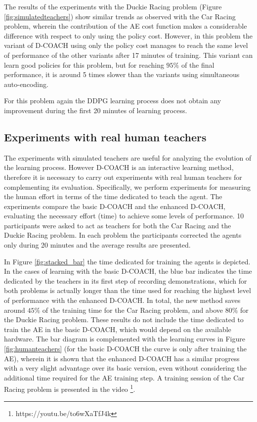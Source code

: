 The results of the experiments with the Duckie Racing problem (Figure \ref{fig:simulatedteachers}) show similar trends as observed with the Car Racing problem, wherein the contribution of the AE cost function makes a considerable difference with respect to only using the policy cost. However, in this problem the variant of D-COACH using only the policy cost manages to reach the same level of performance of the other variants after 17 minutes of training. This variant can learn good policies for this problem, but for reaching $95\%$ of the final performance, it is around 5 times slower than the variants using simultaneous auto-encoding.

For this problem again the DDPG learning process does not obtain any improvement during the first 20 minutes of learning process.

\subsection{Experiments with real human teachers}

The experiments with simulated teachers are useful for analyzing the evolution of the learning process. However D-COACH is an interactive learning method, therefore it is necessary to carry out experiments with real human teachers for complementing its evaluation. Specifically, we perform experiments for measuring the human effort in terms of the time dedicated to teach the agent. The experiments compare the basic D-COACH and the enhanced D-COACH, evaluating the necessary effort (time) to achieve some levels of performance. 10 participants were asked to act as teachers for both the Car Racing and the Duckie Racing problem. In each problem the participants corrected the agents only during 20 minutes and the average results are presented.

In Figure \ref{fig:stacked_bar} the time dedicated for training the agents is depicted. In the cases of learning with the basic D-COACH, the blue bar indicates the time dedicated by the teachers in its first step of recording demonstrations, which for both problems is actually longer than the time used for reaching the highest level of performance with the enhanced D-COACH. In total, the new method saves around $45\%$ of the training time for the Car Racing problem, and above $80\%$ for the Duckie Racing problem. These results do not include the time dedicated to train the AE in the basic D-COACH, which would depend on the available hardware. The bar diagram is complemented with the learning curves in Figure \ref{fig:humanteachers} (for the basic D-COACH the curve is only after training the AE), wherein it is shown that the enhanced D-COACH has a similar progress with a very slight advantage over its basic version, even without considering the additional time required for the AE training step. A training session of the Car Racing problem is presented in the video \footnote{https://youtu.be/to6wXaTfJ4k}.

